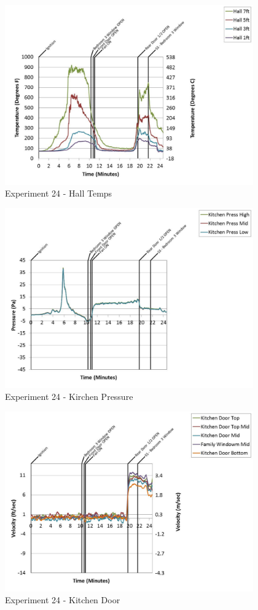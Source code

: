\documentclass{article}
\begin{document}
\begin{appendices}
	\begin{figure}[h!]
		\centering
		\includegraphics[height=3.05in]{0_Images/Results_Charts/Exp_24_Charts/HallTemps.pdf}
		\caption{Experiment 24 - Hall Temps}
	\end{figure}
 
	\clearpage

	\begin{figure}[h!]
		\centering
		\includegraphics[height=3.05in]{0_Images/Results_Charts/Exp_24_Charts/KirchenPressure.pdf}
		\caption{Experiment 24 - Kirchen Pressure}
	\end{figure}
 

	\begin{figure}[h!]
		\centering
		\includegraphics[height=3.05in]{0_Images/Results_Charts/Exp_24_Charts/KitchenDoor.pdf}
		\caption{Experiment 24 - Kitchen Door}
	\end{figure}
 

\end{appendices}
\end{document}
